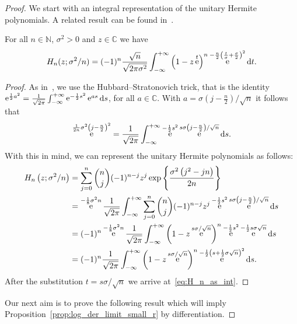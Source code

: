 \documentclass[AHL,Unicode,longabstracts,published]{cedram}
\DeclareMathOperator{\eee}{e}
\newcommand{\N}{\mathbb{N}}
\newcommand{\C}{\mathbb{C}}
\newcommand*\dint{\text{\normalfont d}}
\begin{document}
\begin{proof}
We start with an integral representation of the unitary Hermite polynomials. A related result can be found in~\cite[Proposition~2.1]{shamis_zeitouni}.

\begin{lemm}\label{lem:hubbard_stratonovich}
For all $n\in \N$, $\sigma^2>0$ and $z\in \C$ we have
\begin{equation}\label{eq:H_n_as_int}
H_n(z;\sigma^2/n) = (-1)^n \frac{\sqrt n}{\sqrt{2\pi \sigma^2}} \int_{-\infty}^{+\infty} \left(1 - z\eee^t\right)^n \eee^{-\frac n2 \left(\frac{t}{\sigma} + \frac \sigma 2\right)^2} \dint t.
\end{equation}
\end{lemm}
\begin{proof}
As in~\cite{shamis_zeitouni}, we use the Hubbard--Stratonovich trick, that is the identity $\eee^{\frac 12 a^2} = \frac 1 {\sqrt {2\pi}} \int_{-\infty}^{+\infty} \eee^{- \frac 1 2 s^2} \eee^{a s}\dint s$, for all $a\in \C$. With $a = \sigma (j-\frac n2)/\sqrt n$ it follows that
\[
\eee^{\frac 1{2n} \sigma^2\left(j- \frac n2\right)^2} =
\frac 1 {\sqrt {2\pi}} \int_{-\infty}^{+\infty} \eee^{- \frac 1 2 s^2} \eee^{s \sigma\left(j-\frac n2\right)/\sqrt n}\dint s.
\]
With this in mind, we can represent the unitary Hermite polynomials as follows:
\begin{align*}
H_n\left(z;\sigma^2/n\right) &=
\sum_{j=0}^n \binom nj (-1)^{n-j} z^j \exp\left\{\frac {\sigma^2 \left(j^2 - jn\right)}{2n}\right\} \\
&=
\eee^{-\frac 18 \sigma^2n} \frac 1 {\sqrt {2\pi}} \int_{-\infty}^{+\infty} \sum_{j=0}^n \binom nj (-1)^{n-j} z^j \eee^{-\frac 12 s^2} \eee^{s \sigma \left(j-\frac n2\right)/\sqrt n}\dint s\\
&= (-1)^n \eee^{-\frac 18 \sigma^2n} \frac {1} {\sqrt {2\pi}} \int_{-\infty}^{+\infty} \left(1 - z\eee^{s \sigma/\sqrt n}\right)^n \eee^{-\frac 12 s^2} \eee^{ - \frac 12 s \sigma \sqrt n}\dint s\\
&= (-1)^n \frac {1} {\sqrt {2\pi}} \int_{-\infty}^{+\infty} \left(1 - z\eee^{s \sigma/\sqrt n}\right)^n \eee^{-\frac 12\left(s + \frac12 \sigma \sqrt n\right)^2} \dint s.
\end{align*}
After the substitution $t=s\sigma/\sqrt n$ we arrive at~\eqref{eq:H_n_as_int}.
\end{proof}



Our next aim is to prove the following result which will imply Proposition~\ref{prop:log_der_limit_small_r} by differentiation.


\end{proof}
\end{document}
